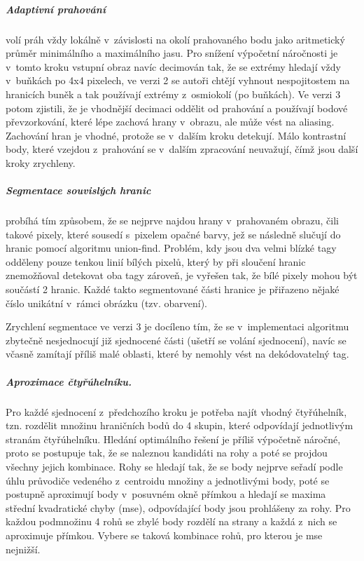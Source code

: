   \subparagraph{Adaptivní prahování} volí práh vždy lokálně v~závislosti na okolí prahovaného bodu jako aritmetický průměr minimálního a maximálního jasu. Pro snížení výpočetní náročnosti je v~tomto kroku vstupní obraz navíc decimován tak, že se extrémy hledají vždy v~buňkách po 4x4 pixelech, ve verzi 2 \cite{apriltag2} se autoři chtějí vyhnout nespojitostem na hranicích buněk a tak používají extrémy z~osmiokolí (po buňkách). Ve verzi 3 \cite{apriltag3} potom zjistili, že je vhodnější decimaci oddělit od prahování a používají bodové převzorkování, které lépe zachová hrany v~obrazu, ale může vést na aliasing. Zachování hran je vhodné, protože se v~dalším kroku detekují. Málo kontrastní body, které vzejdou z~prahování se v~dalším zpracování neuvažují, čímž jsou další kroky zrychleny.

  \subparagraph{Segmentace souvislých hranic} probíhá tím způsobem, že se nejprve najdou hrany v~prahovaném obrazu, čili takové pixely, které sousedí s~pixelem opačné barvy, jež se následně slučují do hranic pomocí algoritmu union-find. Problém, kdy jsou dva velmi blízké tagy odděleny pouze tenkou linií bílých pixelů, který by při sloučení hranic znemožňoval detekovat oba tagy zároveň, je vyřešen tak, že bílé pixely mohou být součástí 2 hranic. Každé takto segmentované části hranice je přiřazeno nějaké číslo unikátní v~rámci obrázku (tzv. obarvení). \cite{apriltag2}
  
  Zrychlení segmentace ve verzi 3 je docíleno tím, že se v~implementaci algoritmu zbytečně nesjednocují již sjednocené části (ušetří se volání sjednocení), navíc se včasně zamítají příliš malé oblasti, které by nemohly vést na dekódovatelný tag. \cite{apriltag3}

  \subparagraph{Aproximace čtyřúhelníku.} Pro každé sjednocení z~předchozího kroku je potřeba najít vhodný čtyřúhelník, tzn. rozdělit množinu hraničních bodů do 4 skupin, které odpovídají jednotlivým stranám čtyřúhelníku. Hledání optimálního řešení je příliš výpočetně náročné, proto se postupuje tak, že se naleznou kandidáti na rohy a poté se projdou všechny jejich kombinace. Rohy se hledají tak, že se body nejprve seřadí podle úhlu průvodiče vedeného z~centroidu množiny a jednotlivými body, poté se postupně aproximují body v~posuvném okně přímkou a hledají se maxima střední kvadratické chyby (\acrshort{mse}), odpovídající body jsou prohlášeny za rohy. Pro každou podmnožinu 4 rohů se zbylé body rozdělí na strany a každá z~nich se aproximuje přímkou. Vybere se taková kombinace rohů, pro kterou je \acrshort{mse} nejnižší. \cite{apriltag2}
  
